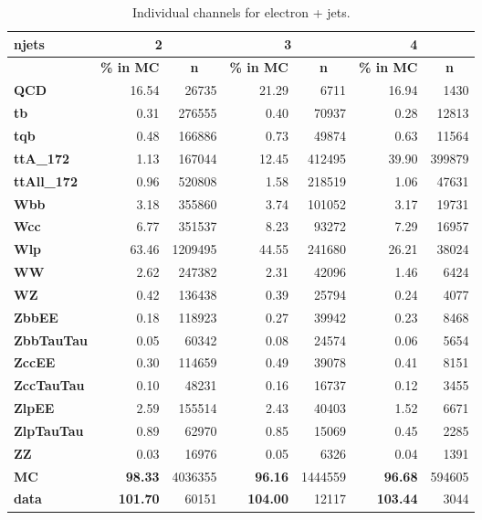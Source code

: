 \begin{table}[t] \footnotesize
\centering
\caption{Individual channels for electron + jets.}
\begin{tabular}{|l|r|r|r|r|r|r|}
\hline
\textbf{njets} & \multicolumn{2}{c|}{\textbf{2}} & \multicolumn{2}{c|}{\textbf{3}} & \multicolumn{2}{c|}{\textbf{4}} \\ \hline
\textbf{} & \multicolumn{1}{l|}{\textbf{\%  in MC}} & \multicolumn{1}{c|}{\textbf{n}} & \multicolumn{1}{l|}{\textbf{\%  in MC}} & \multicolumn{1}{c|}{\textbf{n}} & \multicolumn{1}{l|}{\textbf{\%  in MC}} & \multicolumn{1}{c|}{\textbf{n}} \\ \hline
\textbf{QCD} & 16.54 & 26735 & 21.29 & 6711 & 16.94 & 1430 \\ \hline
\textbf{tb} & 0.31 & 276555 & 0.40 & 70937 & 0.28 & 12813 \\ \hline
\textbf{tqb} & 0.48 & 166886 & 0.73 & 49874 & 0.63 & 11564 \\ \hline
\textbf{ttA\_172} & 1.13 & 167044 & 12.45 & 412495 & 39.90 & 399879 \\ \hline
\textbf{ttAll\_172} & 0.96 & 520808 & 1.58 & 218519 & 1.06 & 47631 \\ \hline
\textbf{Wbb} & 3.18 & 355860 & 3.74 & 101052 & 3.17 & 19731 \\ \hline
\textbf{Wcc} & 6.77 & 351537 & 8.23 & 93272 & 7.29 & 16957 \\ \hline
\textbf{Wlp} & 63.46 & 1209495 & 44.55 & 241680 & 26.21 & 38024 \\ \hline
\textbf{WW} & 2.62 & 247382 & 2.31 & 42096 & 1.46 & 6424 \\ \hline
\textbf{WZ} & 0.42 & 136438 & 0.39 & 25794 & 0.24 & 4077 \\ \hline
\textbf{ZbbEE} & 0.18 & 118923 & 0.27 & 39942 & 0.23 & 8468 \\ \hline
\textbf{ZbbTauTau} & 0.05 & 60342 & 0.08 & 24574 & 0.06 & 5654 \\ \hline
\textbf{ZccEE} & 0.30 & 114659 & 0.49 & 39078 & 0.41 & 8151 \\ \hline
\textbf{ZccTauTau} & 0.10 & 48231 & 0.16 & 16737 & 0.12 & 3455 \\ \hline
\textbf{ZlpEE} & 2.59 & 155514 & 2.43 & 40403 & 1.52 & 6671 \\ \hline
\textbf{ZlpTauTau} & 0.89 & 62970 & 0.85 & 15069 & 0.45 & 2285 \\ \hline
\textbf{ZZ} & 0.03 & 16976 & 0.05 & 6326 & 0.04 & 1391 \\ \hline \hline
\textbf{MC} & \textbf{98.33} & 4036355 & \textbf{96.16} & 1444559 & \textbf{96.68} & 594605 \\ \hline
\textbf{data} & \textbf{101.70} & 60151 & \textbf{104.00} & 12117 & \textbf{103.44} & 3044 \\ \hline
\end{tabular}
\label{tab:chnl-ele}
\end{table}
